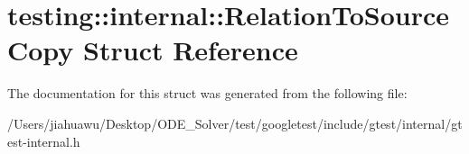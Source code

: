 \hypertarget{structtesting_1_1internal_1_1_relation_to_source_copy}{}\section{testing\+:\+:internal\+:\+:Relation\+To\+Source\+Copy Struct Reference}
\label{structtesting_1_1internal_1_1_relation_to_source_copy}


The documentation for this struct was generated from the following file\+:\begin{DoxyCompactItemize}
\item 
/\+Users/jiahuawu/\+Desktop/\+O\+D\+E\+\_\+\+Solver/test/googletest/include/gtest/internal/gtest-\/internal.\+h\end{DoxyCompactItemize}
